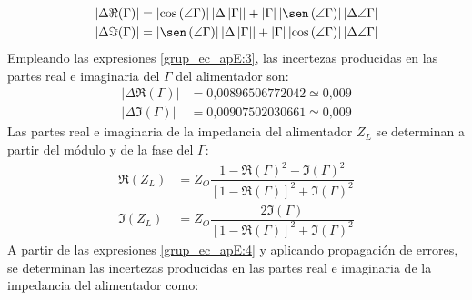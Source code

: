 \begin{subequations}
\label{grup_ec_apE:3}
\begin{align}
\left|\Delta\Re\!\left(\Gamma\right)\right| &= \left|\cos\left(\angle\Gamma\right)\right|\left|\Delta\left|\Gamma\right|\right| + \left|\Gamma\right|\left|\sen\left(\angle\Gamma\right)\right|\left|\Delta\angle\Gamma\right|
\label{ec_apE:8}\\
\left|\Delta\Im\!\left(\Gamma\right)\right| &= \left|\sen\left(\angle\Gamma\right)\right|\left|\Delta\left|\Gamma\right|\right| + \left|\Gamma\right|\left|\cos\left(\angle\Gamma\right)\right|\left|\Delta\angle\Gamma\right|
\label{ec_apE:9}
\end{align}
\end{subequations}
Empleando las expresiones \eqref{grup_ec_apE:3}, las incertezas producidas en las partes real e imaginaria del $\Gamma$ del alimentador son:
\begin{align*}
\left|\Delta\Re\!\left(\Gamma\right)\right| &= \text{0,00896506772042} \simeq \text{0,009}\\
\left|\Delta\Im\!\left(\Gamma\right)\right| &= \text{0,00907502030661} \simeq \text{0,009}
\end{align*}
Las partes real e imaginaria de la impedancia del alimentador $Z_L$ se determinan a partir del módulo y de la fase del $\Gamma$:
\begin{subequations}
\label{grup_ec_apE:4}
\begin{align}
\Re\!\left(Z_L\right) &= Z_O\dfrac{1 - \Re\!\left(\Gamma\right)^2 - \Im\!\left(\Gamma\right)^2}{\left[1 - \Re\!\left(\Gamma\right)\right]^2 + \Im\!\left(\Gamma\right)^2}
\label{ec_apE:10}\\
\Im\!\left(Z_L\right) &= Z_O\dfrac{2\Im\!\left(\Gamma\right)}{\left[1 - \Re\!\left(\Gamma\right)\right]^2 + \Im\!\left(\Gamma\right)^2}
\label{ec_apE:11}
\end{align}
\end{subequations}
A partir de las expresiones \eqref{grup_ec_apE:4} y aplicando propagación de errores, se determinan las incertezas producidas en las partes real e imaginaria de la impedancia del alimentador como:
